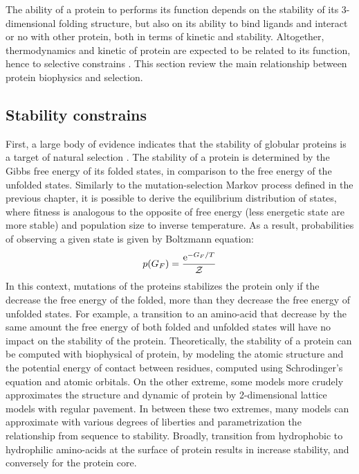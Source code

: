 The ability of a protein to performs its function depends on the stability of its 3-dimensional folding structure, but also on its ability to bind ligands and interact or no with other protein, both in terms of kinetic and stability.
Altogether, thermodynamics and kinetic of protein are expected to be related to its function, hence to selective constrains \citep{Bastolla2017}.
This section review the main relationship between protein biophysics and selection.

\subsection{Stability constrains}

First, a large body of evidence indicates that the stability of globular proteins is a target of natural selection \citep{Sikosek2014}.
The stability of a protein is determined by the Gibbs free energy of its folded states, in comparison to the free energy of the unfolded states.
Similarly to the mutation-selection Markov process defined in the previous chapter, it is possible to derive the equilibrium distribution of states, where fitness is analogous to the opposite of free energy (less energetic state are more stable) and population size to inverse temperature.
As a result, probabilities of observing a given state is given by Boltzmann equation:
\begin{align}
	p(G_F) = \dfrac{\mathrm{e}^{- G_F / T}}{\mathcal{Z}}
\end{align}
In this context, mutations of the proteins stabilizes the protein only if the decrease the free energy of the folded, more than they decrease the free energy of unfolded states.
For example, a transition to an amino-acid that decrease by the same amount the free energy of both folded and unfolded states will have no impact on the stability of the protein.
Theoretically, the stability of a protein can be computed with biophysical of protein, by modeling the atomic structure and the potential energy of contact between residues, computed using Schrodinger's equation and atomic orbitals.
On the other extreme, some models more crudely approximates the structure and dynamic of protein by 2-dimensional lattice models with regular pavement. 
In between these two extremes, many models can approximate with various degrees of liberties and parametrization the relationship from sequence to stability.
Broadly, transition from hydrophobic to hydrophilic amino-acids at the surface of protein results in increase stability, and conversely for the protein core.

